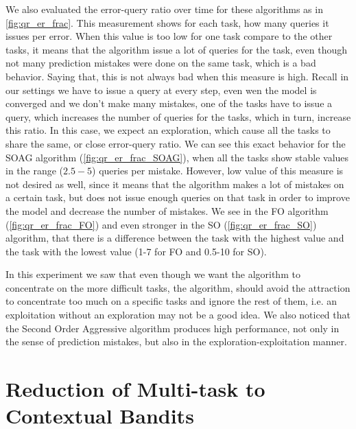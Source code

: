 We also evaluated the error-query ratio over time for these algorithms as in 
\eqref{fig:qr_er_frac}. This measurement shows for each task, how many queries 
it issues per error. When this value is too low for one task compare to the other tasks, it means that the algorithm 
issue a lot of queries for the task, even though not many prediction mistakes  
were done on the same task, which is a bad behavior. Saying that, this is not always bad when this 
measure is high. Recall in our settings we have to issue a query at every step, even wen the model 
is converged and we don't make many mistakes, one of the tasks have to issue a query, which increases the 
number of queries for the tasks, which in turn, increase this ratio. In this case, we expect an 
exploration, which cause all the tasks to share 
the same, or close error-query ratio. We can see this exact behavior for the SOAG algorithm 
(\eqref{fig:qr_er_frac_SOAG}), when all the tasks show stable values in the 
range ($2.5-5$) queries per mistake. However, low value of this measure is not desired as well, since it 
means that the algorithm makes a lot of mistakes on a certain task, but does not 
issue enough queries on that task in order to improve the model and decrease the number of 
mistakes. We see in the FO algorithm (\eqref{fig:qr_er_frac_FO}) and even stronger in the SO 
(\eqref{fig:qr_er_frac_SO}) algorithm, that there is a difference between the 
task with the highest value and the task with the lowest value (1-7 for FO and 0.5-10 for 
SO).

In this experiment we saw that even though we want the algorithm to concentrate on 
the more difficult tasks, the algorithm, should avoid the attraction to concentrate too much on a specific 
tasks and ignore the rest of them, i.e. an exploitation without an exploration may not be a good 
idea. We also noticed that the Second Order Aggressive algorithm produces high 
performance, not only in the sense of prediction mistakes, but also in the 
exploration-exploitation manner.



\section{Reduction of Multi-task to Contextual Bandits}


